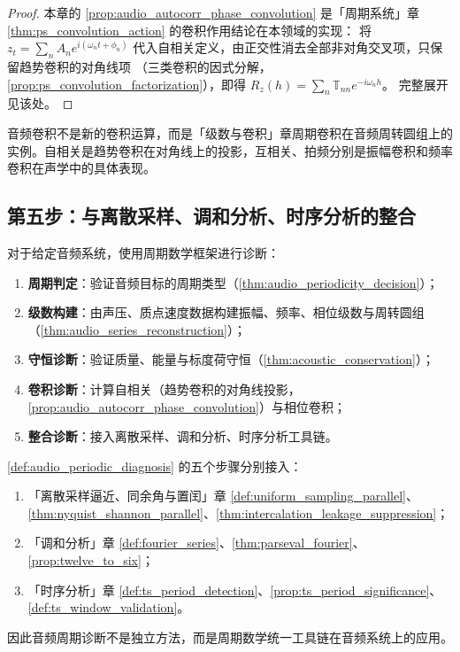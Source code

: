 \begin{proof}
本章的 \cref{prop:audio_autocorr_phase_convolution} 是「周期系统」章 \cref{thm:ps_convolution_action} 的卷积作用结论在本领域的实现：
将 $z_t=\sum_n A_n e^{i(\omega_n t+\phi_n)}$ 代入自相关定义，由正交性消去全部非对角交叉项，只保留趋势卷积的对角线项
（三类卷积的因式分解，\cref{prop:ps_convolution_factorization}），即得 $R_z(h)=\sum_n\mathbb T_{nn}e^{-i\omega_n h}$。
完整展开见该处。
\end{proof}

\begin{remark}[音频卷积与周期卷积的关系]\label{rem:audio_convolution_relation}
音频卷积不是新的卷积运算，而是「级数与卷积」章周期卷积在音频周转圆组上的实例。自相关是趋势卷积在对角线上的投影，互相关、拍频分别是振幅卷积和频率卷积在声学中的具体表现。
\end{remark}

\subsection{第五步：与离散采样、调和分析、时序分析的整合}

\begin{definition}[音频周期诊断流程]\label{def:audio_periodic_diagnosis}
对于给定音频系统，使用周期数学框架进行诊断：
\begin{enumerate}[label=(\roman*)]
    \item \textbf{周期判定}：验证音频目标的周期类型（\cref{thm:audio_periodicity_decision}）；
    \item \textbf{级数构建}：由声压、质点速度数据构建振幅、频率、相位级数与周转圆组（\cref{thm:audio_series_reconstruction}）；
    \item \textbf{守恒诊断}：验证质量、能量与标度荷守恒（\cref{thm:acoustic_conservation}）；
    \item \textbf{卷积诊断}：计算自相关（趋势卷积的对角线投影，\cref{prop:audio_autocorr_phase_convolution}）与相位卷积；
    \item \textbf{整合诊断}：接入离散采样、调和分析、时序分析工具链。
\end{enumerate}
\end{definition}

\begin{theorem}[音频周期诊断流程与三章接口]\label{thm:audio_diagnosis_integration}
\cref{def:audio_periodic_diagnosis} 的五个步骤分别接入：
\begin{enumerate}[label=(\roman*)]
    \item 「离散采样逼近、同余角与置闰」章 \cref{def:uniform_sampling_parallel}、\cref{thm:nyquist_shannon_parallel}、\cref{thm:intercalation_leakage_suppression}；
    \item 「调和分析」章 \cref{def:fourier_series}、\cref{thm:parseval_fourier}、\cref{prop:twelve_to_six}；
    \item 「时序分析」章 \cref{def:ts_period_detection}、\cref{prop:ts_period_significance}、\cref{def:ts_window_validation}。
\end{enumerate}
因此音频周期诊断不是独立方法，而是周期数学统一工具链在音频系统上的应用。
\end{theorem}

